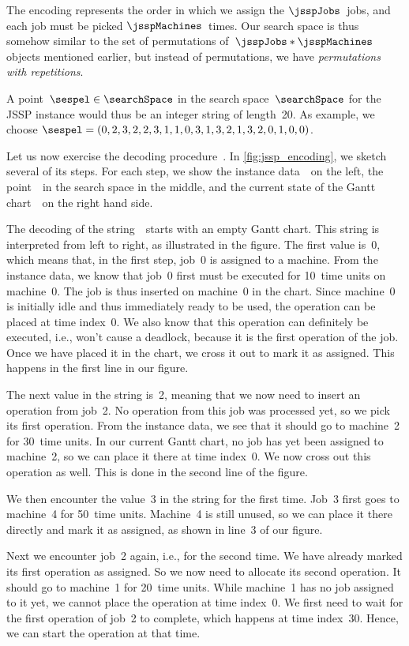 The encoding represents the order in which we assign the $\jsspJobs$~jobs, and each job must be picked $\jsspMachines$~times.
Our search space is thus somehow similar to the set of permutations of~$\jsspJobs*\jsspMachines$ objects mentioned earlier, but instead of permutations, we have \emph{permutations with repetitions}.

A point~$\sespel\in\searchSpace$ in the search space~$\searchSpace$ for the  \gls{JSSP} instance would thus be an integer string of length~20.
As example, we choose $\sespel=(0, 2, 3, 2, 2, 3, 1, 1, 0, 3, 1, 3, 2, 1, 3, 2, 0, 1, 0, 0)$.

Let us now exercise the decoding procedure~\decodeOf{\sespel}.
In \cref{fig:jssp_encoding}, we sketch several of its steps.
For each step, we show the instance data~\instance\ on the left, the point~\sespel\ in the search space in the middle, and the current state of the Gantt chart~\solspel\ on the right hand side.

The decoding of the string~\sespel\ starts with an empty Gantt chart.
This string is interpreted from left to right, as illustrated in the figure.
The first value is~0, which means that, in the first step, job~0 is assigned to a machine.
From the instance data, we know that job~0 first must be executed for 10~time units on machine~0.
The job is thus inserted on machine~0 in the chart.
Since machine~0 is initially idle and thus immediately ready to be used, the operation can be placed at time index~0.
We also know that this operation can definitely be executed, i.e., won't cause a deadlock, because it is the first operation of the job.
Once we have placed it in the chart, we cross it out to mark it as assigned.
This happens in the first line in our figure.

The next value in the string is~2, meaning that we now need to insert an operation from job~2.
No operation from this job was processed yet, so we pick its first operation.
From the instance data, we see that it should go to machine~2 for 30~time units.
In our current Gantt chart, no job has yet been assigned to machine~2, so we can place it there at time index~0.
We now cross out this operation as well.
This is done in the second line of the figure.

We then encounter the value~3 in the string for the first time.
Job~3 first goes to machine~4 for 50~time units.
Machine~4 is still unused, so we can place it there directly and mark it as assigned, as shown in line~3 of our figure.

Next we encounter job~2 again, i.e., for the second time.
We have already marked its first operation as assigned.
So we now need to allocate its second operation.
It should go to machine~1 for 20~time units.
While machine~1 has no job assigned to it yet, we cannot place the operation at time index~0.
We first need to wait for the first operation of job~2 to complete, which happens at time index~30.
Hence, we can start the operation at that time.

